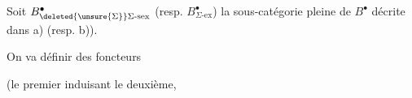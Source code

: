 {%
Soit $B^{\bullet}_{\deleted{\unsure{\Sigma}}\Sigma\text{-}\mathrm{sex}}$ (resp. $B^{\bullet}_{\Sigma\text{-}\mathrm{ex}}$) la sous-catégorie pleine de $B^{\bullet}$ décrite dans a) (resp. b)).

On va définir des foncteurs


(le premier induisant le deuxième,
}

